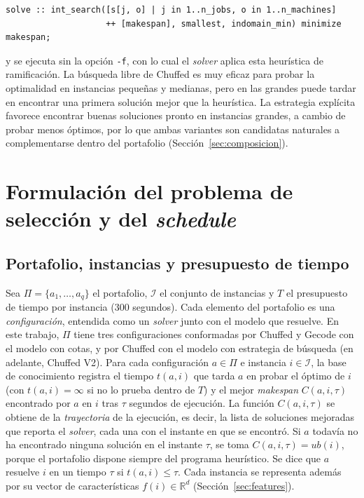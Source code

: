 {\singlespacing\small
\begin{verbatim}
solve :: int_search([s[j, o] | j in 1..n_jobs, o in 1..n_machines]
                    ++ [makespan], smallest, indomain_min) minimize makespan;
\end{verbatim}
}

\noindent y se ejecuta sin la opción \texttt{-f}, con lo cual el
\textit{solver} aplica esta heurística de ramificación. La búsqueda libre de
Chuffed es muy eficaz para probar la optimalidad en instancias pequeñas y
medianas, pero en las grandes puede tardar en encontrar una primera solución
mejor que la heurística. La estrategia explícita favorece encontrar buenas
soluciones pronto en instancias grandes, a cambio de probar menos óptimos, por
lo que ambas variantes son candidatas naturales a complementarse dentro del
portafolio (Sección~\ref{sec:composicion}).

\section{Formulación del problema de selección y del \textit{schedule}}
\label{sec:formulacion_schedule}

\subsection{Portafolio, instancias y presupuesto de tiempo}
Sea $\Pi = \{a_1, \dots, a_q\}$ el portafolio, $\mathcal{I}$ el conjunto de
instancias y $T$ el presupuesto de tiempo por instancia (300 segundos). Cada
elemento del portafolio es una \textit{configuración}, entendida como un
\textit{solver} junto con el modelo que resuelve. En este trabajo, $\Pi$ tiene
tres configuraciones conformadas por Chuffed y Gecode con el modelo con cotas,
y por Chuffed con el modelo con estrategia de búsqueda (en adelante, Chuffed
V2). Para cada configuración $a \in \Pi$ e instancia $i \in \mathcal{I}$, la
base de conocimiento registra el tiempo $t(a, i)$ que tarda $a$ en probar el
óptimo de $i$ (con $t(a,i) = \infty$ si no lo prueba dentro de $T$) y el mejor
\textit{makespan} $C(a, i, \tau)$ encontrado por $a$ en $i$ tras $\tau$
segundos de ejecución. La función $C(a, i, \tau)$ se obtiene de la
\textit{trayectoria} de la ejecución, es decir, la lista de soluciones
mejoradas que reporta el \textit{solver}, cada una con el instante en que se
encontró. Si $a$ todavía no ha encontrado ninguna solución en el instante
$\tau$, se toma $C(a, i, \tau) = ub(i)$, porque el portafolio dispone siempre
del programa heurístico. Se dice que $a$ resuelve $i$ en un tiempo $\tau$ si
$t(a, i) \le \tau$. Cada instancia se representa además por su vector de
características $f(i) \in \mathbb{R}^{d}$ (Sección~\ref{sec:features}).

